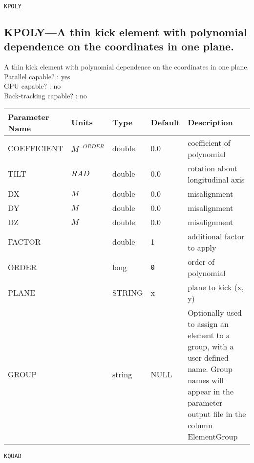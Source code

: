 \newpage
\begin{center}{\Large\verb|KPOLY|}\end{center}
\subsection{KPOLY---A thin kick element with polynomial dependence on the coordinates in one plane.}
A thin kick element with polynomial dependence on the coordinates in one plane.
\\
Parallel capable? : yes\\
GPU capable? : no\\
Back-tracking capable? : no\\
\begin{tabular}{|l|l|l|l|p{\descwidth}|} \hline
Parameter Name & Units & Type & Default & Description \\ \hline 
COEFFICIENT & $M^{-ORDER}$ & double &  0.0 & coefficient of polynomial  \\ \hline 
TILT & $RAD$ & double &  0.0 & rotation about longitudinal axis  \\ \hline 
DX & $M$ & double &  0.0 & misalignment  \\ \hline 
DY & $M$ & double &  0.0 & misalignment  \\ \hline 
DZ & $M$ & double &  0.0 & misalignment  \\ \hline 
FACTOR &  & double &   1 & additional factor to apply  \\ \hline 
ORDER &  & long &  \verb|0| & order of polynomial  \\ \hline 
PLANE &  & STRING &   x               & plane to kick (x, y)  \\ \hline 
GROUP &  & string & NULL & Optionally used to assign an element to a group, with a user-defined name.  Group names will appear in the parameter output file in the column ElementGroup  \\ \hline 
\end{tabular}

\newpage
\begin{center}{\Large\verb|KQUAD|}\end{center}
